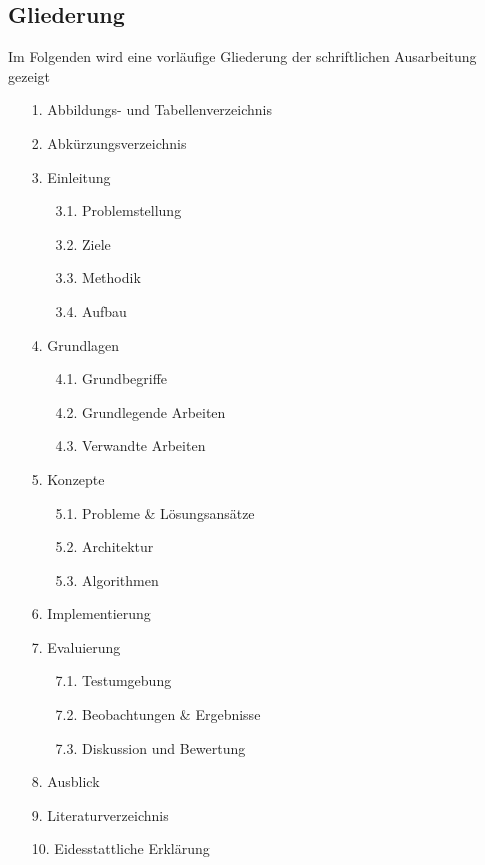 \documentclass[11pt]{article}
\begin{document}
    \subsection{Gliederung}
    Im Folgenden wird eine vorläufige Gliederung der schriftlichen Ausarbeitung gezeigt
    \begin{itemize}
        \item[1.] Abbildungs- und Tabellenverzeichnis
        \item[2.] Abkürzungsverzeichnis
        \item[3.] Einleitung
        \begin{itemize}
            \item[3.1.] Problemstellung
            \item[3.2.] Ziele
            \item[3.3.] Methodik
            \item[3.4.] Aufbau
        \end{itemize}
        \item[4.] Grundlagen
        \begin{itemize}
            \item[4.1.] Grundbegriffe
            \item[4.2.] Grundlegende Arbeiten
            \item[4.3.] Verwandte Arbeiten
        \end{itemize}
        \item[5.] Konzepte
        \begin{itemize}
            \item[5.1.] Probleme \& Lösungsansätze
            \item[5.2.] Architektur
            \item[5.3.] Algorithmen
        \end{itemize}
        \item[6.] Implementierung
        \item[7.] Evaluierung
        \begin{itemize}
            \item[7.1.] Testumgebung
            \item[7.2.] Beobachtungen \& Ergebnisse
            \item[7.3.] Diskussion und Bewertung
        \end{itemize}
        \item[8.] Ausblick
        \item[9.] Literaturverzeichnis
        \item[10.] Eidesstattliche Erklärung
    \end{itemize}
\end{document}

